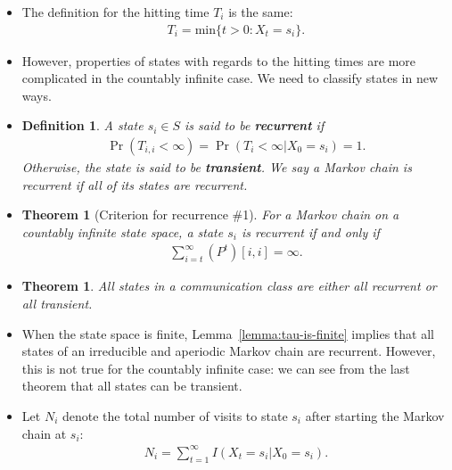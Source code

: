 \documentclass[10pt]{article}
\newtheorem{theorem}[lemma]{Theorem}
\newtheorem{definition}[lemma]{Definition}
\newcommand{\mrm}[1]{\mathrm{#1}}
\begin{document}
\begin{itemize}
  \item The definition for the hitting time $T_i$ is the same:
  \begin{align*}
      T_i = \mrm{min} \{ t > 0 : X_t = s_i\}.
  \end{align*}

  \item However, properties of states with regards to the hitting times are more complicated in the countably infinite case. We need to classify states in new ways.
  
  \item \begin{definition}
    A state $s_i \in S$ is said to be {\bf recurrent} if
    \begin{align*}
        \Pr(T_{i,i} < \infty) = \Pr(T_i < \infty | X_0 = s_i) = 1.
    \end{align*}
    Otherwise, the state is said to be {\bf transient}. We say a Markov chain is recurrent if all of its states are recurrent.
  \end{definition}

  \item \begin{theorem}[Criterion for recurrence \#1] For a Markov chain on a countably infinite state space, a state $s_i$ is recurrent if and only if
  \begin{align*}
      \sum_{i=t}^\infty (P^t)[i,i] = \infty.
  \end{align*}  
  \end{theorem}

  \item \begin{theorem}
    All states in a communication class are either all recurrent or all transient.
  \end{theorem}

  \item When the state space is finite, Lemma~\ref{lemma:tau-is-finite} implies that all states of an irreducible and aperiodic Markov chain are recurrent. However, this is not true for the countably infinite case: we can see from the last theorem that all states can be transient.
  
  \item Let $N_i$ denote the total number of visits to state $s_i$ after starting the Markov chain at $s_i$:
  \begin{align*}
      N_i = \sum_{t=1}^\infty I(X_t = s_i | X_0 = s_i).
  \end{align*}


\end{itemize}
\end{document}
